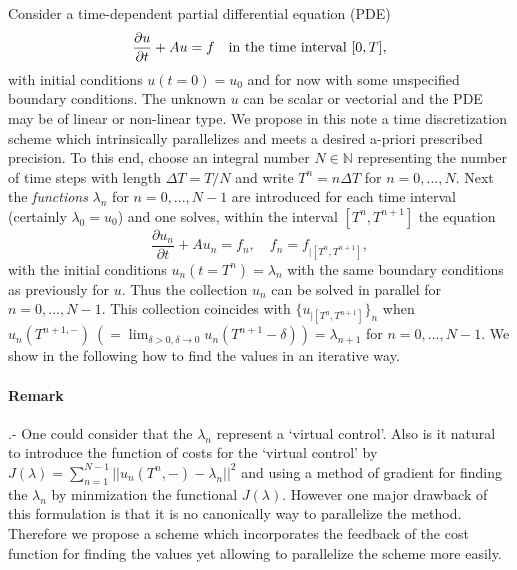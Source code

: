 Consider a time-dependent partial differential equation (PDE)
\begin{equation}
\frac{\partial{u}}{\partial{t}} + Au = f\quad \textnormal{in the time interval}\ [0, T],
\end{equation}
with initial conditions $u(t=0) = u_0$ and for now with some unspecified boundary conditions.
The unknown $u$ can be scalar or vectorial and the PDE may be of linear or non-linear type.
We propose in this note a time discretization scheme which intrinsically parallelizes and
meets a desired a-priori prescribed precision. To this end, choose an integral number 
$N \in \mathbb{N}$ representing the number of time steps with length $\Delta T = T / N$ 
and write $T^n = n \Delta T$ for $n=0, ... ,N$. Next the \textit{functions} $\lambda_n$ for
$n=0, ..., N-1$ are introduced for each time interval (certainly $\lambda_0 = u_0$) and one
solves, within the interval $[T^n, T^{n+1}]$ the equation
\begin{equation}
\frac{\partial u_n}{\partial t} + A u_n = f_n, \quad f_n = f_{|[T^n, T^{n+1}]},
\end{equation}
with the initial conditions $u_n(t=T^n)=\lambda_n$ with the same boundary conditions as
previously for $u$. Thus the collection $u_n$ can be solved in parallel for $n=0, ..., N-1$.
This collection coincides with 
$\{u_{|[T^n, T^{n+1}]}\}_n$ when $u_n(T^{n+1,-})\ (=\lim_{\delta>0, \delta \to 0} u_n(T^{n+1} - \delta)) = \lambda_{n+1}$
for $n=0, ..., N-1$. We show in the following how to find the values in an iterative way.

\paragraph{Remark}.- One could consider that the $\lambda_n$ represent a `virtual control'. 
Also is it natural to introduce the function of costs for the `virtual control' by 
$J(\lambda) = \sum_{n=1}^{N-1} ||u_n(T^n,-) - \lambda_n||^2$ and using a method of gradient
for finding the $\lambda_n$ by minmization the functional $J(\lambda)$. However one major
drawback of this formulation is that it is no canonically way to parallelize the method.
Therefore we propose a scheme which incorporates the feedback of the cost function for
finding the values yet allowing to parallelize the scheme more easily.

